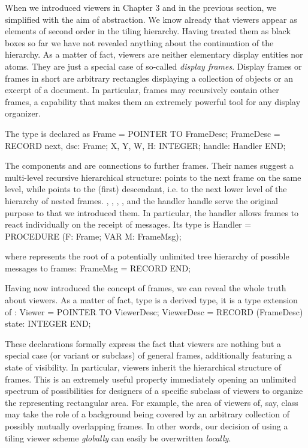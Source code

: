 When we introduced viewers in Chapter 3 and in the previous section, we simplified with the aim of abstraction. We know already that viewers appear as elements of second order in the tiling hierarchy. Having treated them as black boxes so far we have not revealed anything about the continuation of the hierarchy. As a matter of fact, viewers are neither elementary display entities nor atoms. They are just a special case of so-called \emph{display frames}. Display frames or frames in short are arbitrary rectangles displaying a collection of objects or an excerpt of a document. In particular, frames may recursively contain other frames, a capability that makes them an extremely powerful tool for any display organizer.

The type  is declared as
\begintt
Frame = POINTER TO FrameDesc;
FrameDesc = RECORD
  next, dsc: Frame;
  X, Y, W, H: INTEGER;
  handle: Handler
END;
\endtt

\noindent The components  and  are connections to further frames. Their names suggest a multi-level recursive hierarchical structure:  points to the next frame on the same level, while  points to the (first) descendant, i.e. to the next lower level of the hierarchy of nested frames. , , , , and the handler handle serve the original purpose to that we introduced them. In particular, the handler allows frames to react individually on the receipt of messages. Its type is
\begintt
Handler = PROCEDURE (F: Frame; VAR M: FrameMsg);
\endtt

\noindent where  represents the root of a potentially unlimited tree hierarchy of possible messages to frames:
\begintt
FrameMsg = RECORD END;
\endtt

\noindent Having now introduced the concept of frames, we can reveal the whole truth about viewers. As a matter of fact, type  is a derived type, it is a type extension of :
\begintt
Viewer = POINTER TO ViewerDesc;
ViewerDesc = RECORD (FrameDesc)
  state: INTEGER
END;
\endtt

\noindent These declarations formally express the fact that viewers
are nothing but a special case (or variant or subclass) of general
frames, additionally featuring a state of visibility. In particular,
viewers inherit the hierarchical structure of frames. This is an
extremely useful property immediately opening an unlimited spectrum of
possibilities for designers of a specific subclass of viewers to
organize the representing rectangular area. For example, the area of
viewers of, say, class  may take the role of a background being
covered by an arbitrary collection of possibly mutually overlapping
frames. In other words, our decision of using a tiling viewer scheme
\emph{globally} can easily be overwritten \emph{locally}.

